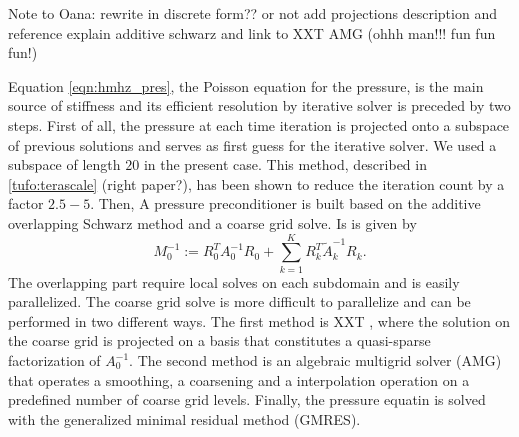 \documentclass{sig-alternate}
\begin{document}
Note to Oana: rewrite in discrete form?? or not
add projections description and reference
explain additive schwarz and link to XXT AMG (ohhh man!!! fun fun fun!)

Equation \ref{eqn:hmhz_pres}, the Poisson equation for the pressure, is the main source of stiffness and its efficient resolution by iterative solver is preceded by two steps. First of all, the pressure at each time iteration is projected onto a subspace of previous solutions and serves as first guess for the iterative solver. We used a subspace of length $20$ in the present case. This method, described in \ref{tufo:terascale} (right paper?), has been shown to reduce the iteration count by a factor $2.5-5$. Then, A pressure preconditioner is built based on the additive overlapping Schwarz method and a coarse grid solve. Is is given by 
\begin{equation}
 M_0^{-1} := R_0^T A_{0}^{-1} R_0 + \sum_{k=1}^{K} R_k^T \tilde{A}_k^{-1} R_k.
\end{equation}
The overlapping part require local solves on each subdomain and is easily parallelized. The coarse grid solve is more difficult to parallelize and can be performed in two different ways. The first method is XXT \cite{Tufo2001151}, where the solution on the coarse grid is projected on a basis that constitutes a quasi-sparse factorization of $A_0^{-1}$. The second method is an algebraic multigrid solver (AMG) that operates a smoothing, a coarsening and a interpolation operation on a predefined number of coarse grid levels. Finally, the pressure equatin is solved with the generalized minimal residual method (GMRES).
\end{document}
